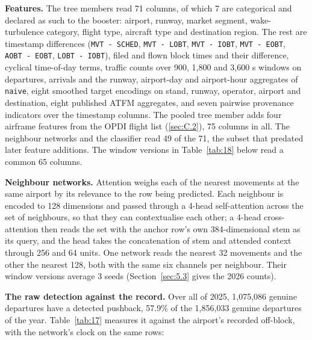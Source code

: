 \documentclass[
  manuscript=article,
  layout=preprint,
  year=2026,
  volume=x,
]{extra/joas}
\begin{document}
\textbf{Features.} The tree members read 71 columns, of which 7 are categorical and declared as such to the booster: airport, runway, market segment, wake-turbulence category, flight type, aircraft type and destination region. The rest are timestamp differences (\texttt{MVT\ -\ SCHED}, \texttt{MVT\ -\ LOBT}, \texttt{MVT\ -\ IOBT}, \texttt{MVT\ -\ EOBT}, \texttt{AOBT\ -\ EOBT}, \texttt{LOBT\ -\ IOBT}), filed and flown block times and their difference, cyclical time-of-day terms, traffic counts over 900, 1,800 and 3,600 s windows on departures, arrivals and the runway, airport-day and airport-hour aggregates of \texttt{naive}, eight smoothed target encodings on stand, runway, operator, airport and destination, eight published ATFM aggregates, and seven pairwise provenance indicators over the timestamp columns. The pooled tree member adds four airframe features from the OPDI flight list (\ref{sec:C.2}), 75 columns in all. The neighbour networks and the classifier read 49 of the 71, the subset that predated later feature additions. The window versions in Table~\ref{tab:18} below read a common 65 columns.

\textbf{Neighbour networks.} Attention weighs each of the nearest movements at the same airport by its relevance to the row being predicted. Each neighbour is encoded to 128 dimensions and passed through a 4-head self-attention across the set of neighbours, so that they can contextualise each other; a 4-head cross-attention then reads the set with the anchor row's own 384-dimensional stem as its query, and the head takes the concatenation of stem and attended context through 256 and 64 units. One network reads the nearest 32 movements and the other the nearest 128, both with the same six channels per neighbour. Their window versions average 3 seeds (Section~\ref{sec:5.3} gives the 2026 counts).

\textbf{The raw detection against the record.} Over all of 2025, 1,075,086 genuine departures have a detected pushback, 57.9\% of the 1,856,033 genuine departures of the year. Table~\ref{tab:17} measures it against the airport's recorded off-block, with the network's clock on the same rows:
\end{document}
